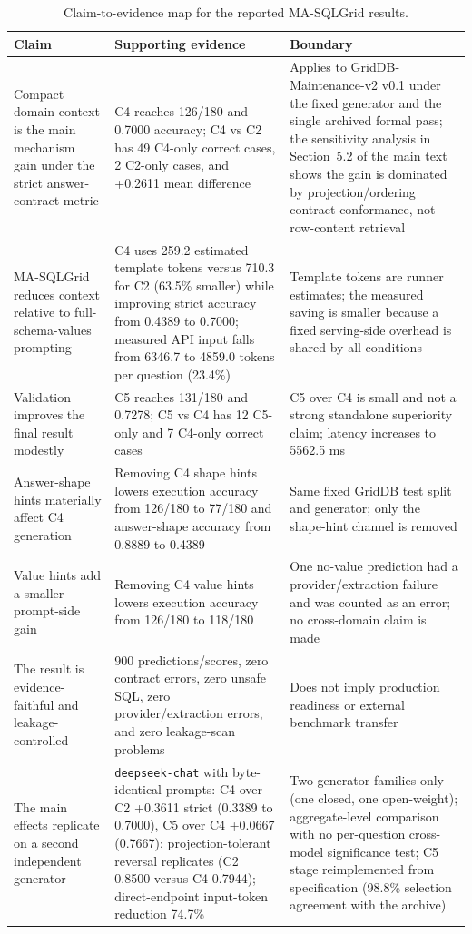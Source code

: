 \documentclass[11pt]{article}
\begin{document}
\begin{table}[htbp]
\caption{Claim-to-evidence map for the reported MA-SQLGrid results.}
\label{tab:sup-claims}
\centering
\footnotesize
\begin{tabularx}{\textwidth}{p{}Xp{}}
\toprule
\textbf{Claim} & \textbf{Supporting evidence} & \textbf{Boundary} \\
\midrule
Compact domain context is the main mechanism gain under the strict answer-contract metric & C4 reaches 126/180 and 0.7000 accuracy; C4 vs C2 has 49 C4-only correct cases, 2 C2-only cases, and +0.2611 mean difference & Applies to GridDB-Maintenance-v2 v0.1 under the fixed generator and the single archived formal pass; the sensitivity analysis in Section~5.2 of the main text shows the gain is dominated by projection/ordering contract conformance, not row-content retrieval \\
MA-SQLGrid reduces context relative to full-schema-values prompting & C4 uses 259.2 estimated template tokens versus 710.3 for C2 (63.5\% smaller) while improving strict accuracy from 0.4389 to 0.7000; measured API input falls from 6346.7 to 4859.0 tokens per question (23.4\%) & Template tokens are runner estimates; the measured saving is smaller because a fixed serving-side overhead is shared by all conditions \\
Validation improves the final result modestly & C5 reaches 131/180 and 0.7278; C5 vs C4 has 12 C5-only and 7 C4-only correct cases & C5 over C4 is small and not a strong standalone superiority claim; latency increases to 5562.5 ms \\
Answer-shape hints materially affect C4 generation & Removing C4 shape hints lowers execution accuracy from 126/180 to 77/180 and answer-shape accuracy from 0.8889 to 0.4389 & Same fixed GridDB test split and generator; only the shape-hint channel is removed \\
Value hints add a smaller prompt-side gain & Removing C4 value hints lowers execution accuracy from 126/180 to 118/180 & One no-value prediction had a provider/extraction failure and was counted as an error; no cross-domain claim is made \\
The result is evidence-faithful and leakage-controlled & 900 predictions/scores, zero contract errors, zero unsafe SQL, zero provider/extraction errors, and zero leakage-scan problems & Does not imply production readiness or external benchmark transfer \\
The main effects replicate on a second independent generator & \texttt{deepseek-chat} with byte-identical prompts: C4 over C2 +0.3611 strict (0.3389 to 0.7000), C5 over C4 +0.0667 (0.7667); projection-tolerant reversal replicates (C2 0.8500 versus C4 0.7944); direct-endpoint input-token reduction 74.7\% & Two generator families only (one closed, one open-weight); aggregate-level comparison with no per-question cross-model significance test; C5 stage reimplemented from specification (98.8\% selection agreement with the archive) \\

\end{tabularx}
\end{table}
\end{document}
